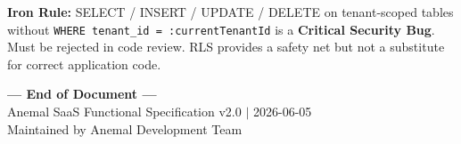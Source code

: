 \documentclass[12pt,a4paper]{report}
\begin{document}
\begin{mdframed}[style=ErrorBox]
\textbf{Iron Rule:} SELECT / INSERT / UPDATE / DELETE on tenant-scoped tables without \texttt{WHERE tenant\_id = :currentTenantId} is a \textbf{Critical Security Bug}. Must be rejected in code review. RLS provides a safety net but not a substitute for correct application code.
\end{mdframed}

\clearpage
\begin{center}
\vspace*{28mm}
{\large\bfseries\color{muted} --- End of Document ---}\\[4mm]
{\small\color{muted}Anemal SaaS Functional Specification v2.0 $|$ 2026-06-05}\\[2mm]
{\small\color{muted}Maintained by Anemal Development Team}
\end{center}
\end{document}
